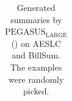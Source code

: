 \begin{table}[h!]
\begin{tabular}{c|p{}}
  \end{tabular}
  \caption{Generated summaries by $\text{PEGASUS}_{\text{LARGE}}$ (\gnews) on AESLC and BillSum. The examples were randomly picked.}
  \label{tab:qualitative_4}
\end{table}
